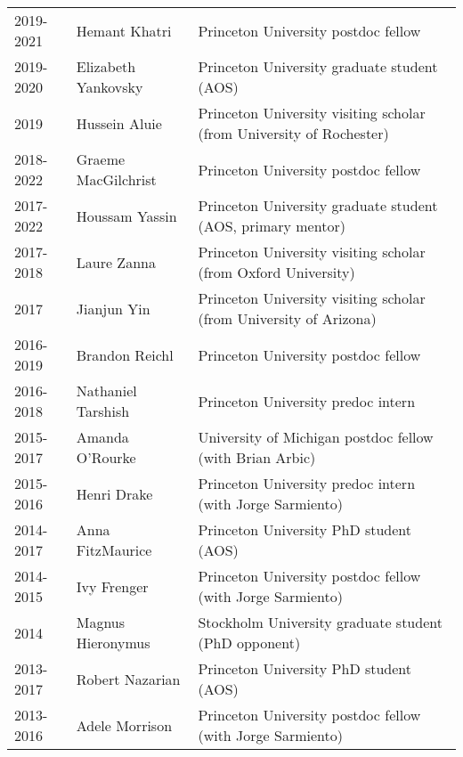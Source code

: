 \documentclass{article}
\begin{document}
\begin{tabular}{lll}
2019-2021 & Hemant Khatri & Princeton University postdoc fellow  \\ 

2019-2020 & Elizabeth Yankovsky & Princeton University graduate student (AOS) \\ 

2019     & Hussein Aluie & Princeton University visiting scholar (from University of Rochester)  \\ 

2018-2022 & Graeme MacGilchrist & Princeton University postdoc fellow \\ 

2017-2022 & Houssam Yassin & Princeton University graduate student (AOS, primary mentor) \\ 

2017-2018 & Laure Zanna  & Princeton University visiting scholar (from Oxford University)  \\

2017 & Jianjun Yin       & Princeton University visiting scholar (from University of Arizona)  \\

2016-2019 & Brandon Reichl       & Princeton University postdoc fellow  \\

2016-2018 & Nathaniel Tarshish & Princeton University predoc intern \\

2015-2017 & Amanda O'Rourke  & University of Michigan postdoc fellow (with Brian Arbic) \\

2015-2016    & Henri Drake             & Princeton University predoc intern (with Jorge Sarmiento) \\

2014-2017 & Anna FitzMaurice   & Princeton University PhD student (AOS) \\ 

2014-2015     & Ivy Frenger            & Princeton University postdoc fellow (with Jorge Sarmiento) \\

2014 & Magnus Hieronymus& Stockholm University graduate student (PhD opponent) \\ 

2013-2017 & Robert Nazarian    & Princeton University PhD student (AOS) \\ 

2013-2016     & Adele Morrison     & Princeton University postdoc fellow (with Jorge Sarmiento) \\


\end{tabular}
\end{document}
